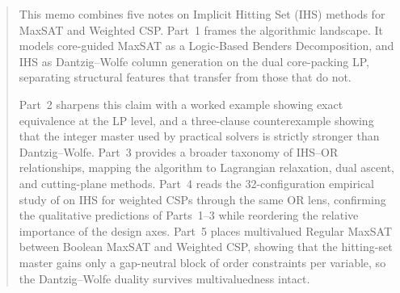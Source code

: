 \begin{abstract}
This memo combines five notes on Implicit Hitting Set (IHS) methods for
MaxSAT and Weighted CSP. Part~1 frames the algorithmic landscape. It models
core-guided MaxSAT as a Logic-Based Benders Decomposition, and IHS as
Dantzig--Wolfe column generation on the dual core-packing LP, separating
structural features that transfer from those that do not.

Part~2 sharpens this claim with a worked example showing exact equivalence at the LP level,
and a three-clause counterexample showing that the integer master used by
practical solvers is strictly stronger than Dantzig--Wolfe. Part~3 provides
a broader taxonomy of IHS--OR relationships, mapping the algorithm to
Lagrangian relaxation, dual ascent, and cutting-plane methods. Part~4 reads the
32-configuration empirical study of \citet{petrova2025empirical} on IHS for
weighted CSPs through the same OR lens, confirming the qualitative
predictions of Parts~1--3 while reordering the relative importance of the
design axes. Part~5 places multivalued Regular MaxSAT between Boolean MaxSAT
and Weighted CSP, showing that the hitting-set master gains only a
gap-neutral block of order constraints per variable, so the Dantzig--Wolfe
duality survives multivaluedness intact.
\end{abstract}
